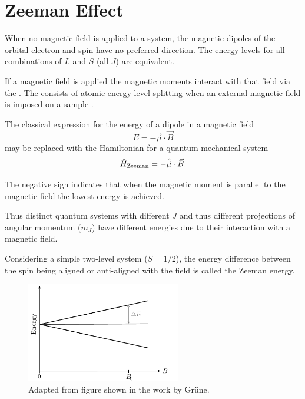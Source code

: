 \section{Zeeman Effect}\label{zeeman}
When no magnetic field is applied to a system, the magnetic dipoles of the orbital electron and spin have no preferred direction. 
The energy levels for all combinations of $L$ and $S$ (all $J$) are equivalent. 

If a magnetic field is applied the magnetic moments interact with that field via the . 
The  consists of atomic energy level splitting when an external magnetic field is imposed on a sample \cite{Nabokov2002}. 

The classical expression for the energy of a dipole in a magnetic field
\begin{equation}
    E = -\vec{\mu}\cdot\vec{B}
    \label{eq:}
\end{equation}
may be replaced with the Hamiltonian for a quantum mechanical system 
\begin{equation}
    \hat{H}_{\ce{Zeeman}} = - \hat{\vec{\mu}}\cdot \vec{B}. 
    \label{eq:}
\end{equation}

The negative sign indicates that when the magnetic moment is parallel to the magnetic field the lowest energy is achieved. 

Thus distinct quantum systems with different $J$ and thus different projections of angular momentum ($m_J$) have different energies due to their interaction with a magnetic field. 

Considering a simple two-level system ($S=1/2$), the energy difference between the spin being aligned or anti-aligned with the field is called the Zeeman energy. 


\begin{figure}[H]
    \begin{center}
        \includegraphics[width=0.6\textwidth]{figures/Zeeman.pdf}
    \end{center}
    \caption{Adapted from figure shown in the work by Gr\"{u}ne. }\label{fig:}
\end{figure}

